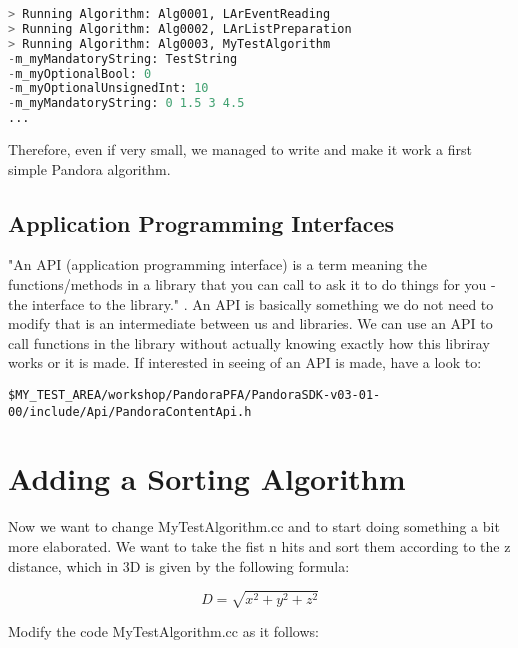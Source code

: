 \begin{lstlisting}[language=Basic, caption=Python example]
> Running Algorithm: Alg0001, LArEventReading
> Running Algorithm: Alg0002, LArListPreparation
> Running Algorithm: Alg0003, MyTestAlgorithm
-m_myMandatoryString: TestString
-m_myOptionalBool: 0
-m_myOptionalUnsignedInt: 10
-m_myMandatoryString: 0 1.5 3 4.5 
...
\end{lstlisting}

Therefore, even if very small, we managed to write and make it work a first simple Pandora algorithm.

\subsection{Application Programming Interfaces} \label{sssec:api}

"An API (application programming interface) is a term meaning the functions/methods in a library that you can call to ask it to do things for you - the interface to the library." \cite{stack_basics}. An API is basically something we do not need to modify that is an intermediate between us and libraries. We can use an API to call functions in the library without actually knowing exactly how this libriray works or it is made. If interested in seeing of an API is made, have a look to:

\begin{verbatim}
$MY_TEST_AREA/workshop/PandoraPFA/PandoraSDK-v03-01-00/include/Api/PandoraContentApi.h 
\end{verbatim}

\section{Adding a Sorting Algorithm} \label{sssec:sorting}

Now we want to change MyTestAlgorithm.cc and to start doing something a bit more elaborated. We want to take the fist n hits and sort them according to the z distance, which in 3D is given by the following formula:

\begin{equation}\label{eq:distance}
D=\sqrt{x^2+y^2+z^2}
\end{equation}

Modify the code MyTestAlgorithm.cc as it follows:

